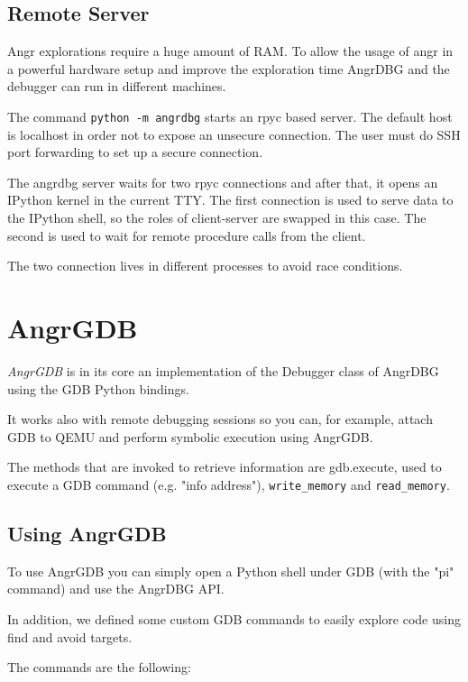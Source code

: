 \subsection{Remote Server}

Angr explorations require a huge amount of RAM. To allow the usage of angr in a powerful hardware setup and improve the exploration time AngrDBG and the debugger can run in different machines.

The command \verb|python -m angrdbg| starts an rpyc \cite{rpyc} based server. The default host is localhost in order not to expose an unsecure connection. The user must do SSH port forwarding to set up a secure connection.

The angrdbg server waits for two rpyc connections and after that, it opens an IPython \cite{ipython} kernel in the current TTY. The first connection is used to serve data to the IPython shell, so the roles of client-server are swapped in this case. The second is used to wait for remote procedure calls from the client.

The two connection lives in different processes to avoid race conditions.



\section{AngrGDB}

{\em AngrGDB} is in its core an implementation of the Debugger class of AngrDBG using the GDB Python bindings.

It works also with remote debugging sessions so you can, for example, attach GDB to QEMU and perform symbolic execution using AngrGDB.

The methods \cite{gdb_py_doc} that are invoked to retrieve information are gdb.execute, used to execute a GDB command (e.g. "info address"), \verb|write_memory| and \verb|read_memory|.

\subsection{Using AngrGDB}

To use AngrGDB you can simply open a Python shell under GDB (with the "pi" command) and use the AngrDBG API.

In addition, we defined some custom GDB commands to easily explore code using find and avoid targets.

The commands are the following:

